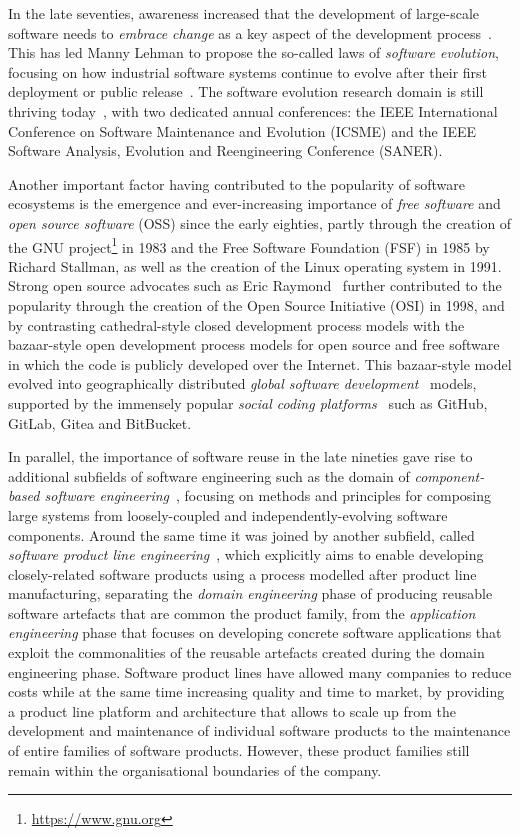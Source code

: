 In the late seventies, awareness increased that the development of large-scale software needs to \emph{embrace change} as a key aspect of the development process~\cite{Yau1978}.
This has led Manny Lehman to propose the so-called laws of \emph{software evolution}, focusing on how industrial software systems continue to evolve after their first deployment or public release~\cite{Lehman1976,Lehman1980,Lehman1980a}.
The software evolution research domain is still thriving today~\cite{Mens2008,Mens2014-ESS}, with two dedicated annual conferences: the IEEE International Conference on Software Maintenance and Evolution (ICSME) and the IEEE Software Analysis, Evolution and Reengineering Conference (SANER).

Another important factor having contributed to the popularity of software ecosystems is the emergence and ever-increasing importance of \emph{free software} and \emph{open source software} (OSS) since the early eighties, partly through the creation of the GNU project\footnote{\url{https://www.gnu.org}} in 1983 and the Free Software Foundation (FSF) in 1985 by Richard Stallman, as well as the creation of the Linux operating system in 1991.
Strong open source advocates such as Eric Raymond~\cite{Raymond1999} further contributed to the popularity through the creation of the Open Source Initiative (OSI) in 1998, and by contrasting cathedral-style closed development process models with the bazaar-style open development process models for open source and free software in which the code is publicly developed over the Internet.
This bazaar-style model evolved into geographically distributed \emph{global software development}~\cite{Grinter1999,Herbsleb2001} models, supported by the immensely popular \emph{social coding platforms}~\cite{Dabbish2012} such as GitHub, GitLab, Gitea and BitBucket.

In parallel, the importance of software reuse in the late nineties gave rise to additional subfields of software engineering such as the domain of \emph{component-based software engineering}~\cite{Szyperski1997,Kozaczynski1998CBSE}, focusing on methods and principles for composing large systems from loosely-coupled and independently-evolving software components.
Around the same time it was joined by another subfield, called \emph{software product line engineering}~\cite{Weiss199SPLE,Clements1999}, which explicitly aims to enable developing closely-related software products using a process modelled after product line manufacturing, separating the \emph{domain engineering} phase of producing reusable software artefacts that are common the product family, from the \emph{application engineering} phase that focuses on developing concrete software applications that exploit the commonalities of the reusable artefacts created during the domain engineering phase.
Software product lines have allowed many companies to reduce costs while at the same time increasing quality and time to market, by providing a product line platform and architecture that allows to scale up from the development and maintenance of individual software products to the maintenance of entire families of software products. However, these product families still remain within the organisational boundaries of the company.

